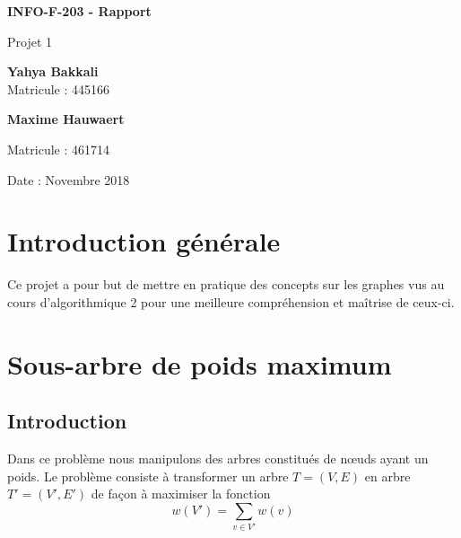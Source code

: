 \documentclass{article}
\begin{document}
\begin{titlepage}
    \begin{center}
        \vspace*{1cm}
        
        \Huge
        \textbf{INFO-F-203 - Rapport}
        
        \vspace{0.5cm}
        \LARGE
        Projet 1
        
        \vspace{1.5cm}
        
        \textbf{Yahya Bakkali\\}
        \Large
        Matricule : 445166\\
        
		\vspace{0.5cm}        
        
        \LARGE
        \textbf{Maxime Hauwaert\\}
        
		\Large        
        Matricule : 461714\\
        
        \vspace{0.8cm}

        Date : Novembre 2018
        
    \end{center}
\end{titlepage}

\setcounter{tocdepth}{3}
\tableofcontents
\newpage
\Large
	
\section{Introduction générale}
Ce projet a pour but de mettre en pratique des concepts sur les graphes vus au cours d’algorithmique 2 pour une meilleure compréhension et maîtrise de ceux-ci.

\section{Sous-arbre de poids maximum}
	\subsection{Introduction}
		Dans ce problème nous manipulons des arbres constitués de nœuds ayant un poids. Le problème consiste à transformer un arbre $T=(V,E)$ en arbre ${T'}=({V'},{E'})$ de façon à maximiser la fonction
		$$w({V'})=\sum_{v\in{V'}} w(v)$$
\end{document}
